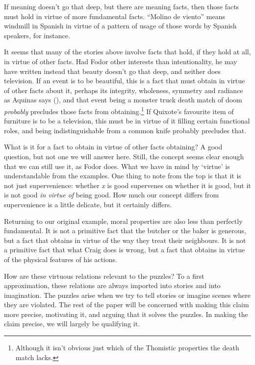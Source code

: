 \documentclass[
  11pt,
  letterpaper,
  DIV=11,
  numbers=noendperiod,
  twoside]{scrartcl}
\begin{document}
If meaning doesn't go that deep, but there are meaning facts, then those
facts must hold in virtue of more fundamental facts. ``Molino de
viento'' means windmill in Spanish in virtue of a pattern of usage of
those words by Spanish speakers, for instance.

It seems that many of the stories above involve facts that hold, if they
hold at all, in virtue of other facts. Had Fodor other interests than
intentionality, he may have written instead that beauty doesn't go that
deep, and neither does television. If an event is to be beautiful, this
is a fact that must obtain in virtue of other facts about it, perhaps
its integrity, wholeness, symmetry and radiance as Aquinas says
(), and that event being a
monster truck death match of doom \emph{probably} precludes those facts
from obtaining.\footnote{Although it isn't obvious just which of the
  Thomistic properties the death match lacks.} If Quixote's favourite
item of furniture is to be a television, this must be in virtue of it
filling certain functional roles, and being indistinguishable from a
common knife probably precludes that.

What is it for a fact to obtain in virtue of other facts obtaining? A
good question, but not one we will answer here. Still, the concept seems
clear enough that we can still use it, as Fodor does. What we have in
mind by `virtue' is understandable from the examples. One thing to note
from the top is that it is not just supervenience: whether \emph{x} is
good supervenes on whether it is good, but it is not good \emph{in
virtue of} being good. How much our concept differs from supervenience
is a little delicate, but it certainly differs.

Returning to our original example, moral properties are also less than
perfectly fundamental. It is not a primitive fact that the butcher or
the baker is generous, but a fact that obtains in virtue of the way they
treat their neighbours. It is not a primitive fact that what Craig does
is wrong, but a fact that obtains in virtue of the physical features of
his actions.

How are these virtuous relations relevant to the puzzles? To a first
approximation, these relations are always imported into stories and into
imagination. The puzzles arise when we try to tell stories or imagine
scenes where they are violated. The rest of the paper will be concerned
with making this claim more precise, motivating it, and arguing that it
solves the puzzles. In making the claim precise, we will largely be
qualifying it.
\end{document}
